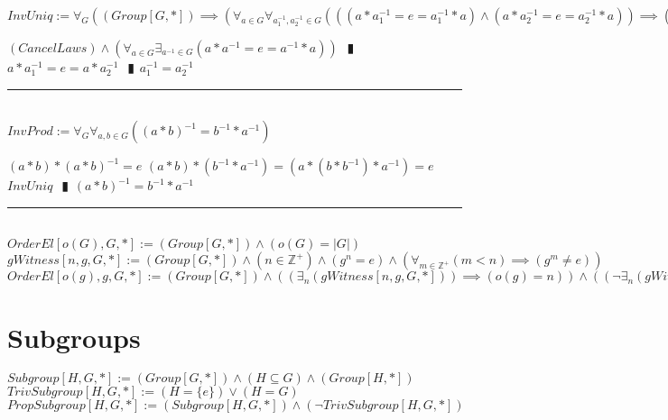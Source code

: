 \documentclass{book}
\newcommand{\abr}{:=}
\newcommand{\pipe}{$\phantom{(}\vrectangleblack\phantom{)}$}
\begin{document}
$InvUniq \abr \forall_{G}((Group[G, *]) \implies (\forall_{a \in G} \forall_{a_1^{-1}, a_2^{-1} \in G}(((a * a_1^{-1} = e = a_1^{-1} * a) \land (a * a_2^{-1} = e = a_2^{-1} * a)) \implies (a_1^{-1} = a_2^{-1}))))$
\begin{enumerate}
  \lit $(CancelLaws) \land (\forall_{a \in G} \exists_{a^{-1} \in G}(a * a^{-1} = e = a^{-1} * a))$ \pipe $a * a_1^{-1} = e = a * a_2^{-1}$ \pipe $a_1^{-1} = a_2^{-1}$
\end{enumerate} \vspace{.75mm} \hrule \vspace{.75mm} \ \\

$InvProd \abr \forall_{G} \forall_{a, b \in G}((a * b)^{-1} = b^{-1} * a^{-1})$
\begin{enumerate}
  \lit $(a * b) * (a * b)^{-1} = e$
  \lit $(a * b) * (b^{-1} * a^{-1}) = (a * (b * b^{-1}) * a^{-1}) = e$
  \lit $InvUniq$ \pipe $(a * b)^{-1} = b^{-1} * a^{-1}$
\end{enumerate} \vspace{.75mm} \hrule \vspace{.75mm} \ \\

$OrderEl[o(G), G, *] \abr (Group[G, *]) \land (o(G) = |G|)$ \\
$gWitness[n, g, G, *] \abr (Group[G, *]) \land (n \in \mathbb{Z}^+) \land (g^n = e) \land (\forall_{m \in \mathbb{Z}^+} (m < n) \implies (g^m \neq e))$ \\
$OrderEl[o(g), g, G, *] \abr (Group[G, *]) \land ((\exists_{n}(gWitness[n, g, G, *])) \implies (o(g) = n)) \land ((\lnot \exists_{n}(gWitness[n, g, G, *])) \implies (o(g) = \infty))$ \\


\section{Subgroups}
$Subgroup[H, G, *] \abr (Group[G, *]) \land (H \subseteq G) \land (Group[H, *])$ \\
$TrivSubgroup[H, G, *] \abr (H = \{e\}) \lor (H = G)$ \\
$PropSubgroup[H, G, *] \abr (Subgroup[H, G, *]) \land (\lnot TrivSubgroup[H, G, *])$ \\
\end{document}
